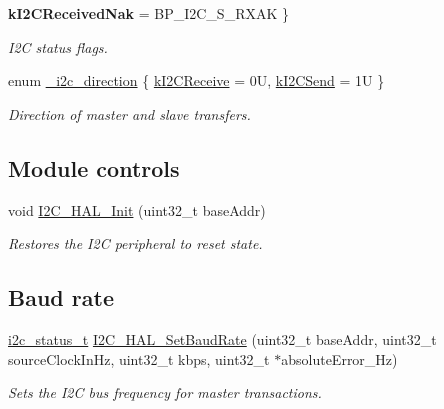 \begin{DoxyCompactItemize}
{\bfseries k\+I2\+C\+Received\+Nak} = B\+P\+\_\+\+I2\+C\+\_\+\+S\+\_\+\+R\+X\+AK
 \}\hypertarget{group__i2c__hal_ga94540c1edc80ad8d2b3173114d04259d}{}\label{group__i2c__hal_ga94540c1edc80ad8d2b3173114d04259d}
\begin{DoxyCompactList}\small\item\em I2C status flags. \end{DoxyCompactList}
\item 
enum \hyperlink{group__i2c__hal_ga1625497320644ba123718bafdd2c1f39}{\+\_\+i2c\+\_\+direction} \{ \hyperlink{group__i2c__hal_gga1625497320644ba123718bafdd2c1f39a452f63617b04cbce09e4a23338c21a4e}{k\+I2\+C\+Receive} = 0U, 
\hyperlink{group__i2c__hal_gga1625497320644ba123718bafdd2c1f39af381933c365d3290c3fceeec2178077a}{k\+I2\+C\+Send} = 1U
 \}\begin{DoxyCompactList}\small\item\em Direction of master and slave transfers. \end{DoxyCompactList}
\end{DoxyCompactItemize}
\subsection*{Module controls}
\begin{DoxyCompactItemize}
\item 
void \hyperlink{group__i2c__hal_gad35451486842f04187c74ab5a2c85d6d}{I2\+C\+\_\+\+H\+A\+L\+\_\+\+Init} (uint32\+\_\+t base\+Addr)
\begin{DoxyCompactList}\small\item\em Restores the I2C peripheral to reset state. \end{DoxyCompactList}\end{DoxyCompactItemize}
\subsection*{Baud rate}
\begin{DoxyCompactItemize}
\item 
\hyperlink{group__i2c__hal_gadcd21817de0b2ccfe00295f61eb078bf}{i2c\+\_\+status\+\_\+t} \hyperlink{group__i2c__hal_gabb3902949b38f861502d989c69ab81b6}{I2\+C\+\_\+\+H\+A\+L\+\_\+\+Set\+Baud\+Rate} (uint32\+\_\+t base\+Addr, uint32\+\_\+t source\+Clock\+In\+Hz, uint32\+\_\+t kbps, uint32\+\_\+t $\ast$absolute\+Error\+\_\+\+Hz)
\begin{DoxyCompactList}\small\item\em Sets the I2C bus frequency for master transactions. \end{DoxyCompactList}\end{DoxyCompactItemize}
